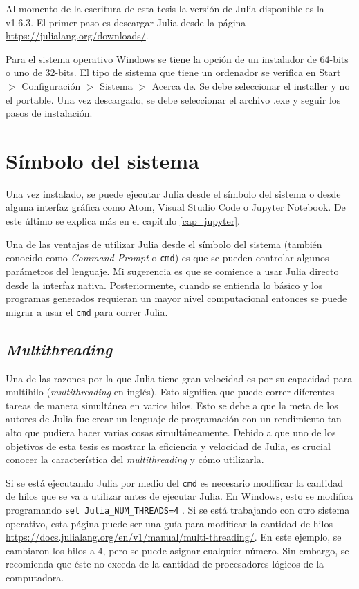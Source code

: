 Al momento de la escritura de esta tesis la versión de \textsf{Julia} disponible es la \textsf{v1.6.3}. El primer paso es descargar \textsf{Julia} desde la página \url{https://julialang.org/downloads/}. 

Para el sistema operativo \textsf{Windows} se tiene la opción de un instalador de 64-bits o uno de 32-bits. El tipo de sistema que tiene un ordenador se verifica en \textsf{Start} $>$ \textsf{Configuración} $>$ \textsf{Sistema} $>$ \textsf{Acerca de}. Se debe seleccionar el \textsf{installer} y no el \textsf{portable}. Una vez descargado, se debe seleccionar el archivo \textsf{.exe} y seguir los pasos de instalación. 

\section{Símbolo del sistema}
Una vez instalado, se puede ejecutar \textsf{Julia} desde el símbolo del sistema o desde alguna interfaz gráfica como \textsf{Atom}, \textsf{Visual Studio Code} o \textsf{Jupyter Notebook}. De este último se explica más en el capítulo \ref{cap_jupyter}. 

Una de las ventajas de utilizar \textsf{Julia} desde el símbolo del sistema (también conocido como \textit{Command Prompt} o \texttt{cmd}) es que se pueden controlar algunos parámetros del lenguaje. Mi sugerencia es que se comience a usar \textsf{Julia} directo desde la interfaz nativa. Posteriormente, cuando se entienda lo básico y los programas generados requieran un mayor nivel computacional entonces se puede migrar a usar el \texttt{cmd} para correr \textsf{Julia}. 

\subsection{\textit{Multithreading}}
Una de las razones por la que \textsf{Julia} tiene gran velocidad es por su capacidad para multihilo (\textit{multithreading} en inglés). Esto significa que puede correr diferentes tareas de manera simultánea en varios hilos. Esto se debe a que la meta de los autores de \textsf{Julia} fue crear un lenguaje de programación con un rendimiento tan alto que pudiera hacer varias cosas simultáneamente. Debido a que uno de los objetivos de esta tesis es mostrar la eficiencia y velocidad de \textsf{Julia}, es crucial conocer la característica del \textit{multithreading} y cómo utilizarla. 

Si se está ejecutando \textsf{Julia} por medio del \texttt{cmd} es necesario modificar la cantidad de hilos que se va a utilizar antes de ejecutar \textsf{Julia}.  En \textsf{Windows}, esto se modifica programando \texttt{set Julia\_NUM\_THREADS=4} \citep{manual_Julia}. Si se está trabajando con otro sistema operativo, esta página puede ser una guía para modificar la cantidad de hilos \url{https://docs.julialang.org/en/v1/manual/multi-threading/}. En este ejemplo, se cambiaron los hilos a 4, pero se puede asignar cualquier número. Sin embargo, se recomienda que éste no exceda de la cantidad de procesadores lógicos de la computadora.  

